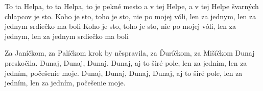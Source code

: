 
\beginverse{}
To ta Helpa, to ta Helpa, to je pekné mesto
a v tej Helpe, a v tej Helpe švarných chlapcov je sto.
Koho je sto, toho je sto, nie po mojej vóli,
len za jednym, len za jednym srdiečko ma boli
Koho je sto, toho je sto, nie po mojej vóli,
len za jednym, len za jednym srdiečko ma boli
\endverse{}

\beginverse{}
\chordsoff{}
Za Janíčkom, za Palíčkom krok by něspravila,
za Ďuríčkom, za Mišíčkom Dunaj preskočila.
Dunaj, Dunaj, Dunaj, Dunaj, aj to širé pole,
len za jedním, len za jedním, počešenie moje.
Dunaj, Dunaj, Dunaj, Dunaj, aj to širé pole,
len za jedním, len za jedním, počešenie moje.
\chordson{}
\endverse{}

\endsong{}
